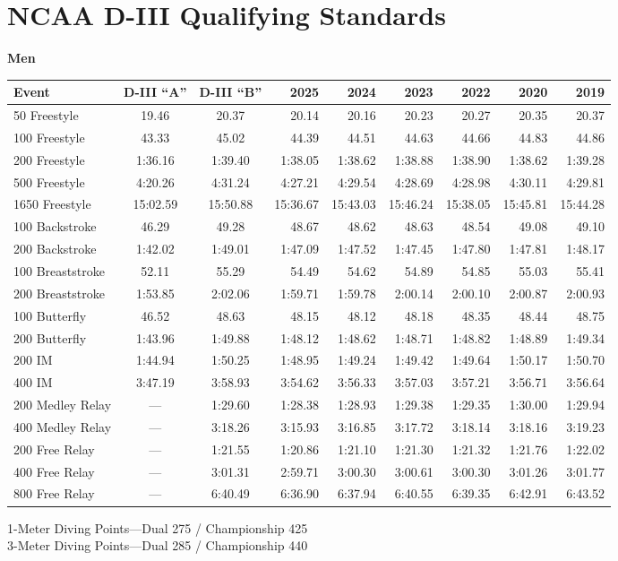 \clearpage
\section{NCAA D-III Qualifying Standards}
\textbf{Men}

\begin{table}[htbp]
\centering
\scriptsize
\begin{tabularx}{\textwidth}{lccrrrrrr}
\toprule
Event & D-III ``A'' & D-III ``B'' & 2025 & 2024 & 2023 & 2022 & 2020 & 2019 \\
\midrule
50 Freestyle & 19.46 & 20.37 & 20.14 & 20.16 & 20.23 & 20.27 & 20.35 & 20.37 \\
100 Freestyle & 43.33 & 45.02 & 44.39 & 44.51 & 44.63 & 44.66 & 44.83 & 44.86 \\
200 Freestyle & 1:36.16 & 1:39.40 & 1:38.05 & 1:38.62 & 1:38.88 & 1:38.90 & 1:38.62 & 1:39.28 \\
500 Freestyle & 4:20.26 & 4:31.24 & 4:27.21 & 4:29.54 & 4:28.69 & 4:28.98 & 4:30.11 & 4:29.81 \\
1650 Freestyle & 15:02.59 & 15:50.88 & 15:36.67 & 15:43.03 & 15:46.24 & 15:38.05 & 15:45.81 & 15:44.28 \\
100 Backstroke & 46.29 & 49.28 & 48.67 & 48.62 & 48.63 & 48.54 & 49.08 & 49.10 \\
200 Backstroke & 1:42.02 & 1:49.01 & 1:47.09 & 1:47.52 & 1:47.45 & 1:47.80 & 1:47.81 & 1:48.17 \\
100 Breaststroke & 52.11 & 55.29 & 54.49 & 54.62 & 54.89 & 54.85 & 55.03 & 55.41 \\
200 Breaststroke & 1:53.85 & 2:02.06 & 1:59.71 & 1:59.78 & 2:00.14 & 2:00.10 & 2:00.87 & 2:00.93 \\
100 Butterfly & 46.52 & 48.63 & 48.15 & 48.12 & 48.18 & 48.35 & 48.44 & 48.75 \\
200 Butterfly & 1:43.96 & 1:49.88 & 1:48.12 & 1:48.62 & 1:48.71 & 1:48.82 & 1:48.89 & 1:49.34 \\
200 IM & 1:44.94 & 1:50.25 & 1:48.95 & 1:49.24 & 1:49.42 & 1:49.64 & 1:50.17 & 1:50.70 \\
400 IM & 3:47.19 & 3:58.93 & 3:54.62 & 3:56.33 & 3:57.03 & 3:57.21 & 3:56.71 & 3:56.64 \\
200 Medley Relay & --- & 1:29.60 & 1:28.38 & 1:28.93 & 1:29.38 & 1:29.35 & 1:30.00 & 1:29.94 \\
400 Medley Relay & --- & 3:18.26 & 3:15.93 & 3:16.85 & 3:17.72 & 3:18.14 & 3:18.16 & 3:19.23 \\
200 Free Relay & --- & 1:21.55 & 1:20.86 & 1:21.10 & 1:21.30 & 1:21.32 & 1:21.76 & 1:22.02 \\
400 Free Relay & --- & 3:01.31 & 2:59.71 & 3:00.30 & 3:00.61 & 3:00.30 & 3:01.26 & 3:01.77 \\
800 Free Relay & --- & 6:40.49 & 6:36.90 & 6:37.94 & 6:40.55 & 6:39.35 & 6:42.91 & 6:43.52 \\
\bottomrule
\end{tabularx}

\vspace{0.5em}
\small{1-Meter Diving Points—Dual 275 / Championship 425 \\
3-Meter Diving Points—Dual 285 / Championship 440}
\end{table}

